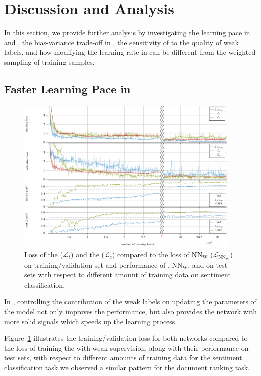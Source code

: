 \section{Discussion and Analysis}
\label{sec:discussion}
\shrink
In this section, we provide further analysis by investigating the learning pace in \cws and \fwl, the bias-variance trade-off in \fwl, the sensitivity of \fwl to the quality of weak labels, and how modifying the learning rate in \fwl can be different from the weighted sampling of training samples.

\subsection{Faster Learning Pace in \cws}
\label{sec:learning_pace}
\begin{figure}[!t]%
    \centering
    \includegraphics[width=0.95\textwidth]{03-part-02/chapter-05/figs_and_tables/plot_loss_cws.pdf}
    \caption{Loss of the \tnet ($\mathcal{L}_t$) and the \cnet ($\mathcal{L}_c$) compared to the loss of $\text{NN}_{\text{W}}$ ($\mathcal{L}_{\text{NN}_{\text{W}}}$) on training/validation set and performance of \cws, $\text{NN}_{\text{W}}$, and \wa on test sets with respect to different amount of training data on sentiment classification.}
    \label{fig:plot_loss_cws}
\end{figure}
In \cws, controlling the contribution of the weak labels on updating the parameters of the model not only improves the performance, but also provides the network with more solid signals which speeds up the learning process. 

Figure~\ref{fig:plot_loss_cws} illustrates the training/validation loss for both networks compared to the loss of training the \tnet with weak supervision, along with their performance on test sets, with respect to different amounts of training data for the sentiment classification task we observed a similar pattern for the document ranking task.

